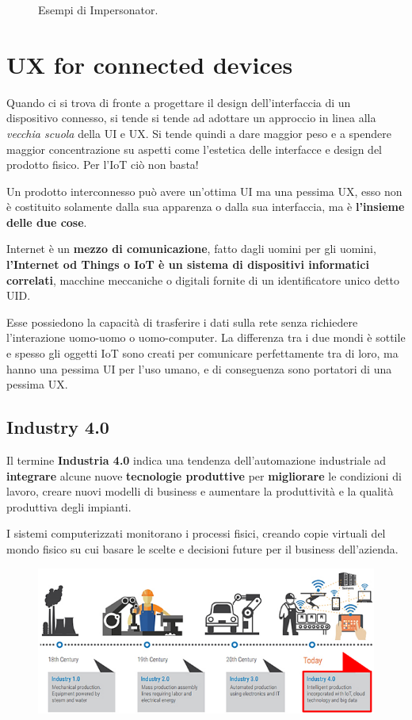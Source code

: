 \documentclass[a4paper,11pt,oneside]{book}
\begin{document}
\begin{figure}[!h]
	\caption{Esempi di Impersonator.}
\end{figure}

\pagebreak

\chapter{UX for connected devices}

Quando ci si trova di fronte a progettare il design dell'interfaccia di un dispositivo
connesso, si tende si tende ad adottare un approccio in linea alla \textit{vecchia
	scuola} della UI e UX. Si tende quindi a dare maggior peso e a spendere maggior concentrazione su aspetti come l'estetica delle interfacce e design del prodotto fisico. Per l'IoT ciò non basta!

Un prodotto interconnesso può avere un'ottima UI ma una pessima UX, esso non è costituito solamente dalla sua apparenza o dalla sua interfaccia, ma è \textbf{l'insieme delle due cose}.

Internet è un \textbf{mezzo di comunicazione}, fatto dagli uomini per gli uomini, \textbf{l'Internet od Things o IoT è un sistema di dispositivi informatici correlati}, macchine meccaniche o digitali fornite di un identificatore unico detto UID.

Esse possiedono la capacità di trasferire i dati sulla rete senza richiedere l'interazione uomo-uomo o uomo-computer.
La differenza tra i due mondi è sottile e spesso gli oggetti IoT sono creati per comunicare perfettamente tra di loro, ma hanno una pessima UI per l'uso umano, e
di conseguenza sono portatori di una pessima UX.

\section{Industry 4.0}

Il termine \textbf{Industria 4.0} indica una tendenza dell'automazione industriale ad \textbf{integrare} alcune nuove \textbf{tecnologie produttive} per \textbf{migliorare} le condizioni di lavoro, creare nuovi modelli di business e aumentare la produttività e la qualità produttiva degli impianti.

I sistemi computerizzati monitorano i processi fisici, creando copie virtuali del mondo fisico su cui basare le scelte e decisioni future per il business dell'azienda.

\begin{figure}[!h]
	\centering
	\includegraphics[scale=0.7]{immagini/Industry4.png}
\end{figure}
\end{document}
